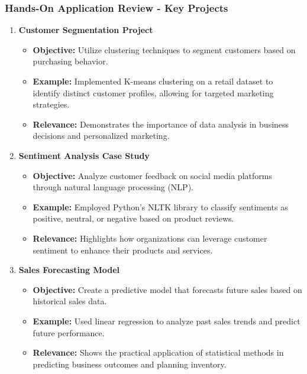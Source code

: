 \documentclass{beamer}
\begin{document}
\begin{frame}[fragile]
    \frametitle{Hands-On Application Review - Key Projects}
    \begin{enumerate}
        \item \textbf{Customer Segmentation Project}
            \begin{itemize}
                \item \textbf{Objective:} Utilize clustering techniques to segment customers based on purchasing behavior.
                \item \textbf{Example:} Implemented K-means clustering on a retail dataset to identify distinct customer profiles, allowing for targeted marketing strategies.
                \item \textbf{Relevance:} Demonstrates the importance of data analysis in business decisions and personalized marketing.
            \end{itemize}
        
        \item \textbf{Sentiment Analysis Case Study}
            \begin{itemize}
                \item \textbf{Objective:} Analyze customer feedback on social media platforms through natural language processing (NLP).
                \item \textbf{Example:} Employed Python’s NLTK library to classify sentiments as positive, neutral, or negative based on product reviews.
                \item \textbf{Relevance:} Highlights how organizations can leverage customer sentiment to enhance their products and services.
            \end{itemize}

        \item \textbf{Sales Forecasting Model}
            \begin{itemize}
                \item \textbf{Objective:} Create a predictive model that forecasts future sales based on historical sales data.
                \item \textbf{Example:} Used linear regression to analyze past sales trends and predict future performance.
                \item \textbf{Relevance:} Shows the practical application of statistical methods in predicting business outcomes and planning inventory.
            \end{itemize}
    \end{enumerate}
\end{frame}
\end{document}
